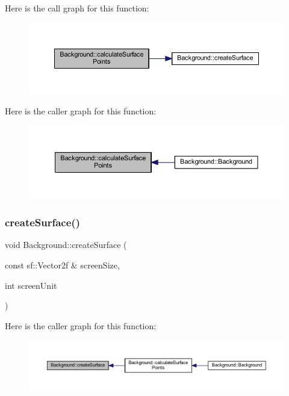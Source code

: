 Here is the call graph for this function\+:
\nopagebreak
\begin{figure}[H]
\begin{center}
\leavevmode
\includegraphics[width=350pt]{class_background_a7ac5e97fcf0c7f714332be76bbfd19e4_cgraph}
\end{center}
\end{figure}
Here is the caller graph for this function\+:
\nopagebreak
\begin{figure}[H]
\begin{center}
\leavevmode
\includegraphics[width=350pt]{class_background_a7ac5e97fcf0c7f714332be76bbfd19e4_icgraph}
\end{center}
\end{figure}
\mbox{\label{class_background_a9efffff9340e0846664ed1a69c6e35e5}} 
\subsubsection{\texorpdfstring{create\+Surface()}{createSurface()}}
{\footnotesize\ttfamily void Background\+::create\+Surface (\begin{DoxyParamCaption}\item[{const sf\+::\+Vector2f \&}]{screen\+Size,  }\item[{int}]{screen\+Unit }\end{DoxyParamCaption})}

Here is the caller graph for this function\+:
\nopagebreak
\begin{figure}[H]
\begin{center}
\leavevmode
\includegraphics[width=350pt]{class_background_a9efffff9340e0846664ed1a69c6e35e5_icgraph}
\end{center}
\end{figure}
\mbox{\label{class_background_a607c05c3678be2dee50c736a11e21a50}} 
